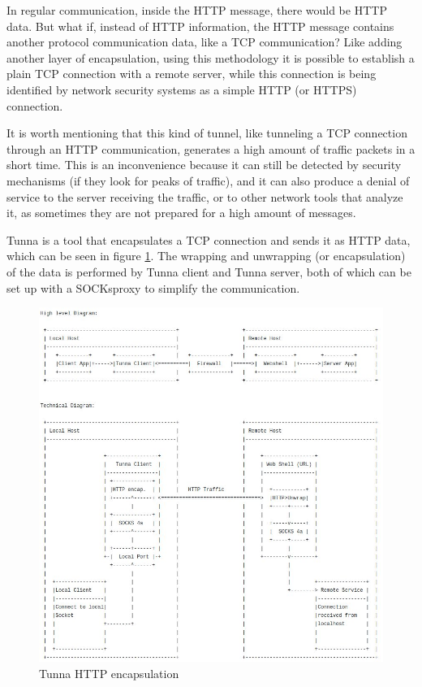 \pagebreak
In regular communication, inside the HTTP message, there would be HTTP data. But what if, instead of HTTP information, the HTTP message contains another protocol communication data, like a TCP communication?  Like adding another layer of encapsulation, using this methodology it is possible to establish a plain TCP connection with a remote server, while this connection is being identified by network security systems as a simple HTTP (or HTTPS) connection.

It is worth mentioning that this kind of tunnel, like tunneling a TCP connection through an HTTP communication, generates a high amount of traffic packets in a short time. This is an inconvenience because it can still be detected by security mechanisms (if they look for peaks of traffic), and it can also produce a denial of service to the server receiving the traffic, or to other network tools that analyze it, as sometimes they are not prepared for a high amount of messages.

Tunna\cite{Tunna} is a tool that encapsulates a TCP connection and sends it as HTTP data, which can be seen in figure \ref{img:tunnaEncap}. The wrapping and unwrapping (or encapsulation) of the data is performed by Tunna client and Tunna server, both of which can be set up with a SOCKs\footnotemark proxy to simplify the communication.


\begin{figure}[!ht]
	\centering
	\includegraphics[width=14cm,trim={0 0 0 9cm},clip]{img/tunnaworks}
	\caption{Tunna HTTP encapsulation}
	\label{img:tunnaEncap}
\end{figure}

